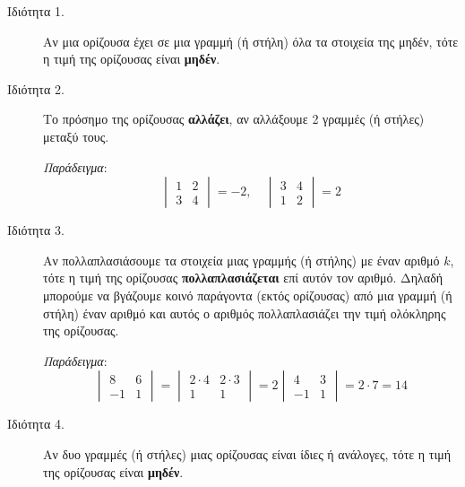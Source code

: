 \documentclass[a4paper,table]{report}
\begin{document}
\begin{center}
  \minibox{\large\bfseries \textcolor{Col1}{Ιδιότητες των Οριζουσών}}
\end{center}

\vspace{\baselineskip}

\begin{description}

  \item[Ιδιότητα 1.] Αν μια ορίζουσα έχει σε μια γραμμή (ή στήλη) όλα τα στοιχεία της 
    μηδέν, τότε η τιμή της ορίζουσας είναι \textbf{μηδέν}.

  \item[Ιδιότητα 2.] Το πρόσημο της ορίζουσας \textbf{αλλάζει}, αν αλλάξουμε 2 
    γραμμές (ή στήλες) μεταξύ τους.

    \textit{Παράδειγμα}: 
    \[
      \begin{vmatrix}
        1 & 2 \\
        3 & 4 
      \end{vmatrix}
      = -2, \quad 
      \begin{vmatrix}
        3 & 4 \\
        1 & 2 
      \end{vmatrix}=2
    \]

  \item[Ιδιότητα 3.] Αν πολλαπλασιάσουμε τα στοιχεία μιας γραμμής (ή στήλης) με έναν
    αριθμό $k$, τότε η τιμή της ορίζουσας \textbf{πολλαπλασιάζεται} επί αυτόν τον 
    αριθμό. Δηλαδή μπορούμε να βγάζουμε κοινό παράγοντα (εκτός ορίζουσας) από μια 
    γραμμή (ή στήλη) έναν αριθμό και αυτός ο αριθμός πολλαπλασιάζει την τιμή ολόκληρης 
    της ορίζουσας.

    \textit{Παράδειγμα}:
    \[
      \begin{vmatrix}
        8 & 6 \\
        -1 & 1 
      \end{vmatrix} =
      \begin{vmatrix}
        2\cdot 4 & 2\cdot 3 \\
        1 & 1 
        \end{vmatrix}=2 \begin{vmatrix}
        4 & 3 \\
        -1 & 1 
      \end{vmatrix}=2\cdot 7 = 14
    \]


  \item[Ιδιότητα 4.] Αν δυο γραμμές (ή στήλες) μιας ορίζουσας είναι ίδιες ή ανάλογες, 
    τότε η τιμή της ορίζουσας είναι \textbf{μηδέν}.


\end{description}
\end{document}
